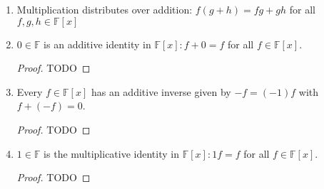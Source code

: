 \documentclass[a4paper]{article}
\begin{document}
\begin{myparindent}{0pt}
\begin{enumerate}[label=(\roman*)]
  \item Multiplication distributes over addition: $f(g + h) = fg + gh$ for all
  $f, g, h \in \mathbb{F}[x]$

  \item $0 \in \mathbb{F}$ is an additive identity in $\mathbb{F}[x]: f + 0 = f$
  for all $f \in \mathbb{F}[x]$.
    \begin{proof}
    TODO
    \end{proof}

  \item Every $f \in \mathbb{F}[x]$ has an additive inverse given by
  $-f = (-1)f$ with $f + (-f) = 0$.
    \begin{proof}
    TODO
    \end{proof}

  \item $1 \in \mathbb{F}$ is the multiplicative identity in
  $\mathbb{F}[x]: 1f = f$ for all $f \in \mathbb{F}[x]$.
    \begin{proof}
    TODO
    \end{proof}
\end{enumerate}

\end{myparindent}
\end{document}
